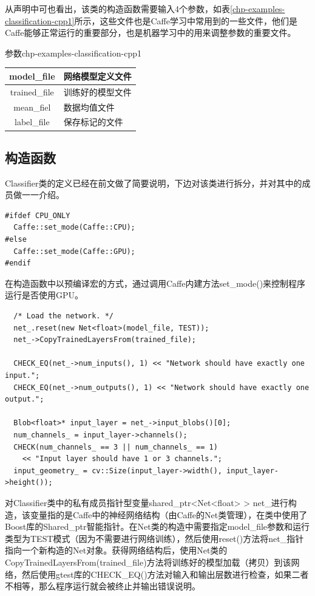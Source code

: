 从声明中可也看出，该类的构造函数需要输入4个参数，如表\ref{chp-examples-classification-cpp1}所示，这些文件也是Caffe学习中常用到的一些文件，他们是Caffe能够正常运行的重要部分，也是机器学习中的用来调整参数的重要文件。
\begin{cntable}{参数}{chp-examples-classification-cpp1}
  \begin{tabular}{|c|l|}
    \hline
    model\_file & 网络模型定义文件 \\ \hline
    trained\_file & 训练好的模型文件 \\ \hline
    mean\_fiel & 数据均值文件 \\ \hline
    label\_file & 保存标记的文件 \\
    \hline
  \end{tabular}
\end{cntable}

\subsection{构造函数}
Classifier类的定义已经在前文做了简要说明，下边对该类进行拆分，并对其中的成员做一一介绍。

\begin{verbatim}
#ifdef CPU_ONLY
  Caffe::set_mode(Caffe::CPU);
#else
  Caffe::set_mode(Caffe::GPU);
#endif
\end{verbatim}
在构造函数中以预编译宏的方式，通过调用Caffe内建方法set\_mode()来控制程序运行是否使用GPU。
\begin{verbatim}
  /* Load the network. */
  net_.reset(new Net<float>(model_file, TEST));
  net_->CopyTrainedLayersFrom(trained_file);

  CHECK_EQ(net_->num_inputs(), 1) << "Network should have exactly one input.";
  CHECK_EQ(net_->num_outputs(), 1) << "Network should have exactly one output.";

  Blob<float>* input_layer = net_->input_blobs()[0];
  num_channels_ = input_layer->channels();
  CHECK(num_channels_ == 3 || num_channels_ == 1)
    << "Input layer should have 1 or 3 channels.";
  input_geometry_ = cv::Size(input_layer->width(), input_layer->height());
\end{verbatim}
对Classifier类中的私有成员指针型变量shared\_ptr<Net<float> > net\_进行构造，该变量指的是Caffe中的神经网络结构（由Caffe的Net类管理），在类中使用了Boost库的Shared\_ptr智能指针。在Net类的构造中需要指定model\_file参数和运行类型为TEST模式（因为不需要进行网络训练），然后使用reset()方法将net\_指针指向一个新构造的Net对象。获得网络结构后，使用Net类的CopyTrainedLayersFrom(trained\_file)方法将训练好的模型加载（拷贝）到该网络，然后使用gtest库的CHECK\_EQ()方法对输入和输出层数进行检查，如果二者不相等，那么程序运行就会被终止并输出错误说明。


